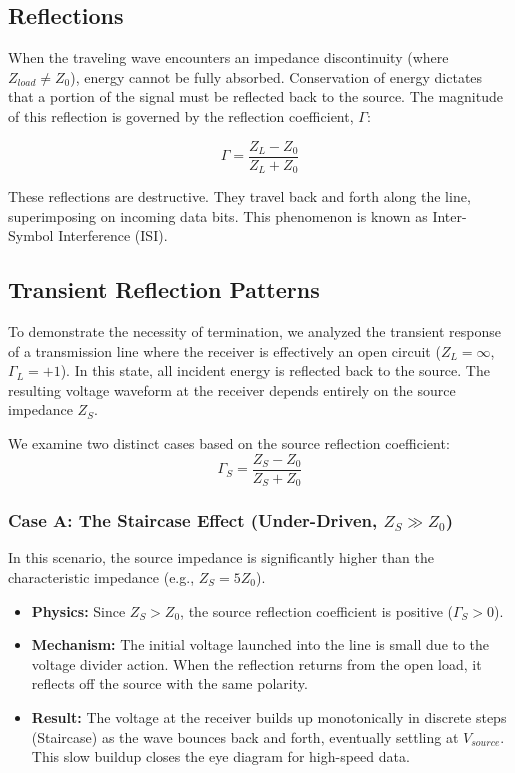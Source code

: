 \subsection*{Reflections}
When the traveling wave encounters an impedance discontinuity (where $Z_{load} \neq Z_0$), energy cannot be fully absorbed. 
Conservation of energy dictates that a portion of the signal must be reflected back to the source. The magnitude of this reflection is governed by the reflection coefficient, $\Gamma$:

\begin{equation} \label{eq:reflection_coefficient}
    \Gamma = \frac{Z_L - Z_0}{Z_L + Z_0}
\end{equation}

These reflections are destructive. They travel back and forth along the line, superimposing on incoming data bits. 
This phenomenon is known as Inter-Symbol Interference (ISI).

\subsection{Transient Reflection Patterns}
To demonstrate the necessity of termination, we analyzed the transient response of a transmission line where the receiver is 
effectively an open circuit ($Z_L = \infty$, $\Gamma_L = +1$). In this state, all incident energy is reflected back to the source. 
The resulting voltage waveform at the receiver depends entirely on the source impedance $Z_S$.

We examine two distinct cases based on the source reflection coefficient:
\begin{equation}
    \Gamma_S = \frac{Z_S - Z_0}{Z_S + Z_0}
\end{equation}

\subsubsection{Case A: The Staircase Effect (Under-Driven, $Z_S \gg Z_0$)}
In this scenario, the source impedance is significantly higher than the characteristic impedance (e.g., $Z_S = 5Z_0$).
\begin{itemize}
    \item \textbf{Physics:} Since $Z_S > Z_0$, the source reflection coefficient is positive ($\Gamma_S > 0$).
    \item \textbf{Mechanism:} The initial voltage launched into the line is small due to the voltage divider action. 
    When the reflection returns from the open load, it reflects off the source with the same polarity.
    \item \textbf{Result:} The voltage at the receiver builds up monotonically in discrete steps (Staircase) as the wave bounces back and forth, 
    eventually settling at $V_{source}$. This slow buildup closes the eye diagram for high-speed data.
\end{itemize}

